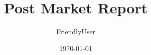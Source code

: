 \documentclass{article}%
\title{Post Market Report}%
\author{FriendlyUser}%
\date{\today}%
\begin{document}
%
\normalsize%
\end{document}
